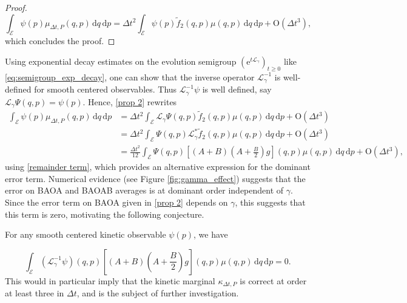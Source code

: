 \begin{proof}
\begin{equation}
  \int_{\mathcal E} \psi(p) \mu_{\Delta t,P}(q,p)\,\mathrm{d}q\,\mathrm{d}p=\Delta t^2\int_{\mathcal E} \psi(p)\tilde f_2(q,p)\mu(q,p)\,\mathrm{d}q\,\mathrm{d}p + \mathrm{O}(\Delta t^3),
\end{equation}
which concludes the proof.
\end{proof}

\begin{remark}
Using exponential decay estimates on the evolution semigroup $(\mathrm{e}^{t\mathcal L_\gamma})_{t\geq 0}$ like \eqref{eq:semigroup_exp_decay}, one can show that the inverse operator $\mathcal L_\gamma^{-1}$ is well-defined for smooth centered observables.
Thus $\mathcal L_\gamma^{-1} \psi$ is well defined, say $\mathcal L_\gamma \Psi(q,p)=\psi(p)$.
Hence, \eqref{prop 2} rewrites 
\begin{align*}
  \int_{\mathcal E} \psi(p) \mu_{\Delta t,P}(q,p)\,\mathrm{d}q\,\mathrm{d}p&=\Delta t^2\int_\mathcal{E}\mathcal L_\gamma \Psi(q,p)\tilde f_2(q,p)\mu(q,p)\,\mathrm{d}q\,\mathrm{d}p+\mathrm{O}(\Delta t^3)\\
  &=\Delta t^2\int_\mathcal{E}\Psi(q,p)\mathcal L_\gamma^*\tilde f_2(q,p)\mu(q,p)\,\mathrm{d}q\,\mathrm{d}p+\mathrm{O}(\Delta t^3)\\
  &=\frac{\Delta t^2}{12}\int_\mathcal{E}\Psi(q,p)\left[\left(A+B\right)\left(A+\frac B2\right)g\right](q,p)\mu(q,p)\,\mathrm{d}q\,\mathrm{d}p+\mathrm{O}(\Delta t^3),
\end{align*}
using \eqref{remainder term}, which provides an alternative expression for the dominant error term.
Numerical evidence (see Figure \ref{fig:gamma_effect}) suggests that the error on BAOA and BAOAB averages is at dominant order independent of $\gamma$. Since the error term on BAOA given in \eqref{prop 2} depends on $\gamma$, this suggests that this term is zero, motivating the following conjecture.
\end{remark}

\begin{conjecture}\label{conjecture}
  For any smooth centered kinetic observable $\psi(p)$, we have
  
  \begin{equation}
    \int_{\mathcal E}\left(\mathcal L_\gamma ^{-1}\psi\right)(q,p)\left[\left(A+B\right)\left(A+\frac B2\right)g\right](q,p)\mu(q,p)\,\mathrm{d}q\,\mathrm{d}p=0.
  \end{equation}
  This would in particular imply that the kinetic marginal $\kappa_{\Delta t,P}$ is correct at order at least three in $\Delta t$, and is the subject of further investigation.
\end{conjecture}

